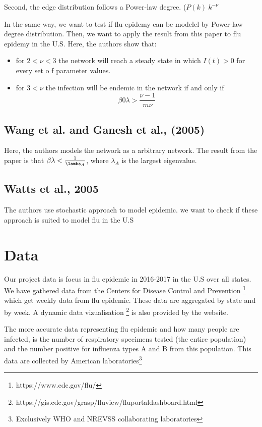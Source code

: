 Second, the edge distribution follows a Power-law degree. ($P(k) ~ k^{-\nu}$

In the same way, we want to test if flu epidemy can be modelel by Power-law degree distribution.
Then, we want to apply the result from this paper to flu epidemy in the U.S.
Here, the authors show that:
\begin{itemize}
    \item for $2<\nu<3$ the network will reach a steady state in which $I(t)>0$ for every set o f parameter values.
    \item for $3<\nu$ the infection will be endemic in the network if and only if 
    $$\beta0 \lambda > \frac{\nu-1}{m \nu}$$
\end{itemize}


\subsection{Wang et al. and Ganesh et al., (2005) \cite{wang2003epidemic,ganesh2005effect}}

Here, the authors models the network as a arbitrary network.
The result from the paper is that $\beta \lambda < \frac{1}{\lamba_A}$, where $\lambda_A$ is the largest eigenvalue.


\subsection{Watts et al., 2005 \cite{watts2005multiscale}
}

The authors use stochastic approach to model epidemic. we want to check if these approach is suited to model flu in the U.S

\section{Data}

Our project data is focus in flu epidemic in 2016-2017 in the U.S over all states.
 We have gathered data from the Centers for Disease Control and Prevention \footnote{https://www.cdc.gov/flu/} which get weekly data from flu epidemic. These data are aggregated by state and by week.
 A dynamic data vizualisation \footnote{https://gis.cdc.gov/grasp/fluview/fluportaldashboard.html} is also provided by the website.
 
 The more accurate data representing flu epidemic and how many people are infected, is the number of respiratory specimens tested (the entire population) and the number positive for influenza types A and B from this population.
 This data are collected by American laboratories\footnote{Exclusively WHO and NREVSS collaborating laboratories}
 
